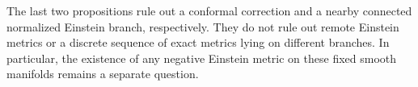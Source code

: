 The last two propositions rule out a conformal correction and a
nearby connected normalized Einstein branch, respectively.  They
do not rule out remote Einstein metrics or a discrete sequence of
exact metrics lying on different branches.  In particular, the
existence of any negative Einstein metric on these fixed smooth
manifolds remains a separate question.

